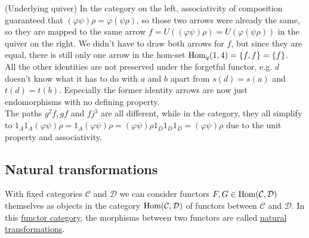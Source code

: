 \begin{example}{(Underlying quiver)}
\noindent In the category on the left, associativity of composition guaranteed that $(\varphi\psi)\rho = \varphi(\psi\rho)$, so those two arrows
were already the same, so they are mapped to the same arrow $f = U((\varphi\psi)\rho) = U(\varphi(\psi\rho))$ in the quiver on the right.
We didn't have to draw both arrows for $f$, but since they are equal, there is still only one arrow in the hom-set $\textup{Hom}_{q}(1,4)=\{f,f\} = \{f\}$.\\
All the other identities are not preserved under the forgetful functor, e.g. $d$ doesn't know what it has to do with $a$ and $b$ apart from
$s(d) = s(a)$ and $t(d) = t(b)$. Especially the former identity arrows are now just endomorphisms with no defining property.\\
The paths $g^{2}f, gf$ and $fj^{3}$ are all different, while in the category, they all simplify to
$1_{A}1_{A}(\varphi\psi)\rho = 1_{A}(\varphi\psi)\rho = (\varphi\psi)\rho1_{D}1_{D}1_{D} =  (\varphi\psi)\rho$ due to the unit property and associativity.
\end{example}


\subsection{Natural transformations}

With fixed categories $\mathcal{C}$ and $\mathcal{D}$ we can consider functors $F, G \in \textup{Hom}(\mathcal{C},\mathcal{D})$ themselves
as objects in the category $\textup{Hom}(\mathcal{C},\mathcal{D})$ of functors between $\mathcal{C}$ and $\mathcal{D}$. In this \ul{functor category},
the morphisms between two functors are called \ul{natural transformations}.

